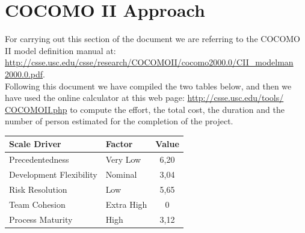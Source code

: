 \chapter{COCOMO II Approach} \label{chap3}
For carrying out this section of the document we are referring to the COCOMO II model definition manual at:\\
\href{http://csse.usc.edu/csse/research/COCOMOII/cocomo2000.0/CII\_modelman2000.0.pdf}{http://csse.usc.edu/csse/research/COCOMOII/cocomo2000.0/CII\_modelman\\2000.0.pdf}.\\
Following this document we have compiled the two tables below, and then we have used the online calculator at this web page: \href{http://csse.usc.edu/tools/COCOMOII.php}{http://csse.usc.edu/tools/\\COCOMOII.php} to compute the effort, the total cost, the duration and the number of person estimated for the completion of the project.

\begin{table}[!htbp]
\begin{center}
\begin{tabular}[t]{|p{}|p{}|c|}
\hline
\textbf{Scale Driver} & \textbf{Factor} & \textbf{Value} \\
\hline
\hline
Precedentedness & Very Low & 6,20 \\
\hline
Development Flexibility & Nominal & 3,04 \\
\hline
Risk Resolution & Low & 5,65 \\
\hline
Team Cohesion & Extra High & 0 \\
\hline
Process Maturity & High & 3,12 \\
\hline
\end{tabular}
\end{center}
\end{table}
\clearpage

